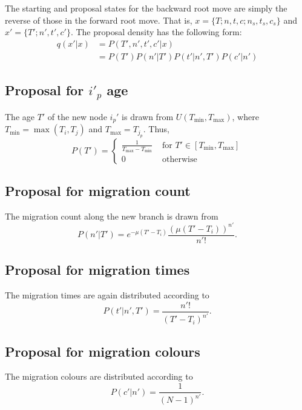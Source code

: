 \documentclass[a4paper,11pt]{article}
\begin{document}
The starting and proposal states for the backward root move are simply
the reverse of those in the forward root move. That is,
$x=\{T;n,t,c;n_s,t_s,c_s\}$ and $x'=\{T';n',t',c'\}$. The proposal
density has the following form:
\begin{align}
  q(x'|x) &= P(T',n',t',c'|x)\nonumber\\
&= P(T')P(n'|T')P(t'|n',T')P(c'|n')
\end{align}

\subsection{Proposal for $i'_p$ age}

The age $T'$ of the new node $i_p'$ is drawn from
$U(T_{\min},T_{\max})$, where $T_{\min}=\max(T_i,T_j)$ and $T_{\max}=T_{j_p}$. Thus,
\begin{equation}
  P(T')=\left\{\begin{array}{rl}
\frac{1}{T_{\max}-T_{\min}} & \text{ for }T'\in[T_{\min},T_{\max}]\\
0 & \text{ otherwise}\end{array}\right.
\end{equation}

\subsection{Proposal for migration count}

The migration count along the new branch is drawn from
\begin{equation}
  P(n'|T')=e^{-\mu(T'-T_i)}\frac{(\mu(T'-T_i))^{n'}}{n'!}.
\end{equation}

\subsection{Proposal for migration times}

The migration times are again distributed according to
\begin{equation}
  P(t'|n',T')=\frac{n'!}{(T'-T_i)^{n'}}.
\end{equation}

\subsection{Proposal for migration colours}
The migration colours are distributed according to
\begin{equation}
  P(c'|n')=\frac{1}{(N-1)^{n'}}.
\end{equation}
\end{document}
